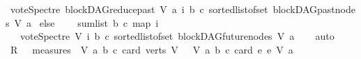 \begin{isabellebody}
\ {\isacharparenleft}{\kern0pt}vote{\isacharunderscore}{\kern0pt}Spectre\ {\isacharparenleft}{\kern0pt}blockDAG{\isachardot}{\kern0pt}reduce{\isacharunderscore}{\kern0pt}past\ V\ a{\isacharparenright}{\kern0pt}\ i\ b\ c{\isacharparenright}{\kern0pt}{\isacharparenright}{\kern0pt}\ {\isacharparenleft}{\kern0pt}sorted{\isacharunderscore}{\kern0pt}list{\isacharunderscore}{\kern0pt}of{\isacharunderscore}{\kern0pt}set\ {\isacharparenleft}{\kern0pt}{\isacharparenleft}{\kern0pt}blockDAG{\isachardot}{\kern0pt}past{\isacharunderscore}{\kern0pt}nodes\ V\ a{\isacharparenright}{\kern0pt}{\isacharparenright}{\kern0pt}{\isacharparenright}{\kern0pt}{\isacharparenright}{\kern0pt}{\isacharparenright}{\kern0pt}\isanewline
\ else\ \isanewline
\ \ \ sumlist\ b\ c\ {\isacharparenleft}{\kern0pt}map\ {\isacharparenleft}{\kern0pt}{\isasymlambda}i{\isachardot}{\kern0pt}\isanewline
\ \ \ {\isacharparenleft}{\kern0pt}vote{\isacharunderscore}{\kern0pt}Spectre\ V\ i\ b\ c{\isacharparenright}{\kern0pt}{\isacharparenright}{\kern0pt}\ {\isacharparenleft}{\kern0pt}sorted{\isacharunderscore}{\kern0pt}list{\isacharunderscore}{\kern0pt}of{\isacharunderscore}{\kern0pt}set\ {\isacharparenleft}{\kern0pt}blockDAG{\isachardot}{\kern0pt}future{\isacharunderscore}{\kern0pt}nodes\ V\ a{\isacharparenright}{\kern0pt}{\isacharparenright}{\kern0pt}{\isacharparenright}{\kern0pt}{\isacharparenright}{\kern0pt}{\isachardoublequoteclose}\isanewline
%
\isadelimproof
\ \ %
\endisadelimproof
%
\isatagproof
{}\isamarkupfalse%
\ auto%
\endisatagproof
{\isafoldproof}%
%
\isadelimproof
\isanewline
%
\endisadelimproof
{}\isamarkupfalse%
\isanewline
%
\isadelimproof
%
\endisadelimproof
%
\isatagproof
{}\isamarkupfalse%
\isanewline
{}\isamarkupfalse%
\ {\isacharquery}{\kern0pt}R\ {\isacharequal}{\kern0pt}\ {\isachardoublequoteopen}\ measures\ {\isacharbrackleft}{\kern0pt}{\isacharparenleft}{\kern0pt}\ {\isasymlambda}{\isacharparenleft}{\kern0pt}V{\isacharcomma}{\kern0pt}\ a{\isacharcomma}{\kern0pt}\ b{\isacharcomma}{\kern0pt}\ c{\isacharparenright}{\kern0pt}{\isachardot}{\kern0pt}\ {\isacharparenleft}{\kern0pt}card\ {\isacharparenleft}{\kern0pt}verts\ V{\isacharparenright}{\kern0pt}{\isacharparenright}{\kern0pt}{\isacharparenright}{\kern0pt}{\isacharcomma}{\kern0pt}\ \ {\isacharparenleft}{\kern0pt}\ {\isasymlambda}{\isacharparenleft}{\kern0pt}V{\isacharcomma}{\kern0pt}\ a{\isacharcomma}{\kern0pt}\ b{\isacharcomma}{\kern0pt}\ c{\isacharparenright}{\kern0pt}{\isachardot}{\kern0pt}\ card\ {\isacharbraceleft}{\kern0pt}e{\isachardot}{\kern0pt}\ e\ {\isasymrightarrow}\isactrlsup {\isacharasterisk}{\kern0pt}\isactrlbsub V\isactrlesub \ a{\isacharbraceright}{\kern0pt}{\isacharparenright}{\kern0pt}{\isacharbrackright}{\kern0pt}\ {\isachardoublequoteclose}\ \ \isanewline

\end{isabellebody}
